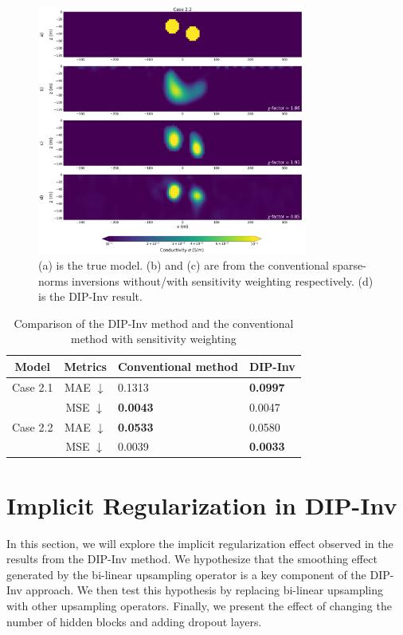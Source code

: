 \documentclass[lettersize,journal]{IEEEtran}
\begin{document}
\begin{figure}[h!]
\centering
\includegraphics[width=3.5in]{Figures/xu10.png}
\caption{(a) is the true model. (b) and (c) are from the conventional sparse-norms inversions without/with sensitivity weighting respectively. (d) is the DIP-Inv result.}
\label{fig_7.5}
\end{figure}

\begin{table}[h!]
\centering
\caption{Comparison of the DIP-Inv method and the conventional method with sensitivity weighting}
\begin{tabular}{|c|c|l|l|}
\hline
Model & Metrics & Conventional method& DIP-Inv\\
\hline
Case 2.1 & MAE $\downarrow$ & 0.1313 & \textbf{0.0997}\\
 & MSE $\downarrow$ & \textbf{0.0043} & 0.0047\\
\hline
Case 2.2 & MAE $\downarrow$ & \textbf{0.0533} & 0.0580\\
 & MSE $\downarrow$ & 0.0039 & \textbf{0.0033}\\
\hline
\end{tabular}
\label{table:A}
\end{table}

\section{Implicit Regularization in DIP-Inv}
\label{sec:4}
In this section, we will explore the implicit regularization effect observed in the results from the DIP-Inv method. We hypothesize that the smoothing effect generated by the bi-linear upsampling operator is a key component of the DIP-Inv approach. We then test this hypothesis by replacing bi-linear upsampling with other upsampling operators. Finally, we present the effect of changing the number of hidden blocks and adding dropout layers. 
\end{document}
